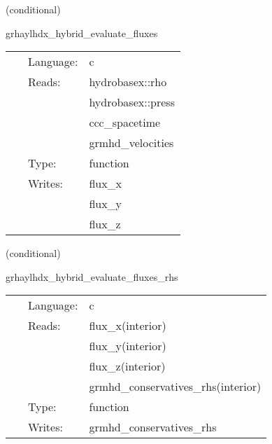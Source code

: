 \documentclass{article}
\begin{document}
\vspace{5mm}

   (conditional) 

\hspace{5mm} grhaylhdx\_hybrid\_evaluate\_fluxes 

\hspace{5mm}{\it hybrid version of grhaylhdx\_evaluate\_fluxes } 


\hspace{5mm}

 \begin{tabular*}{160mm}{cll} 
~ & Language:  & c \\ 
~ & Reads:  & hydrobasex::rho \\ 
~& ~ &hydrobasex::press\\ 
~& ~ &ccc\_spacetime\\ 
~& ~ &grmhd\_velocities\\ 
~ & Type:  & function \\ 
~ & Writes:  & flux\_x \\ 
~& ~ &flux\_y\\ 
~& ~ &flux\_z\\ 
\end{tabular*} 


\vspace{5mm}

   (conditional) 

\hspace{5mm} grhaylhdx\_hybrid\_evaluate\_fluxes\_rhs 

\hspace{5mm}{\it hybrid version of grhaylhdx\_evaluate\_fluxes\_rhs } 


\hspace{5mm}

 \begin{tabular*}{160mm}{cll} 
~ & Language:  & c \\ 
~ & Reads:  & flux\_x(interior) \\ 
~& ~ &flux\_y(interior)\\ 
~& ~ &flux\_z(interior)\\ 
~& ~ &grmhd\_conservatives\_rhs(interior)\\ 
~ & Type:  & function \\ 
~ & Writes:  & grmhd\_conservatives\_rhs \\ 
\end{tabular*} 


\vspace{5mm}
\end{document}
